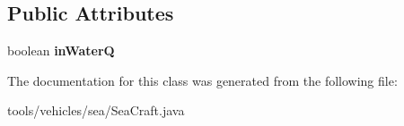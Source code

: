 \subsection*{Public Attributes}
\begin{DoxyCompactItemize}
\item 
boolean {\bfseries in\+WaterQ}\hypertarget{classtools_1_1vehicles_1_1sea_1_1_sea_craft_a9c8c339375deff56e6798e4da2107daf}{}\label{classtools_1_1vehicles_1_1sea_1_1_sea_craft_a9c8c339375deff56e6798e4da2107daf}

\end{DoxyCompactItemize}


The documentation for this class was generated from the following file\+:\begin{DoxyCompactItemize}
\item 
tools/vehicles/sea/Sea\+Craft.\+java\end{DoxyCompactItemize}

